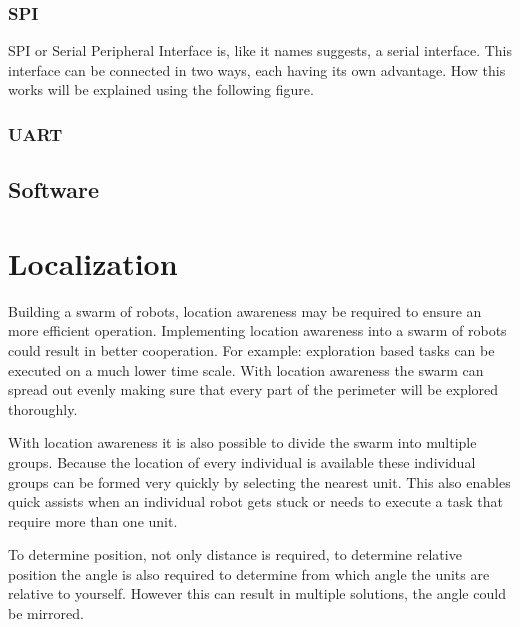 \documentclass[10pt,a4paper]{article}
\begin{document}
\subsubsection{SPI}
SPI or Serial Peripheral Interface is, like it names suggests, a serial interface. This interface can be connected in two ways, each having its own advantage. How this works will be explained using the following figure.

\subsubsection{UART}
\subsection{Software}


\newpage
\section{Localization}
Building a swarm of robots, location awareness may be required to ensure an more efficient operation. Implementing location awareness into a swarm of robots could result in better cooperation. For example: exploration based tasks can be executed on a much lower time scale. With location awareness the swarm can spread out evenly making sure that every part of the perimeter will be explored thoroughly. 

With location awareness it is also possible to divide the swarm into multiple groups. Because the location of every individual is available these individual groups can be formed very quickly by selecting the nearest unit. This also enables quick assists when an individual robot gets stuck or needs to execute a task that require more than one unit.

To determine position, not only distance is required, to determine relative position the angle is also required to determine from which angle the units are relative to yourself. However this can result in multiple solutions, the angle could be mirrored.
\end{document}
